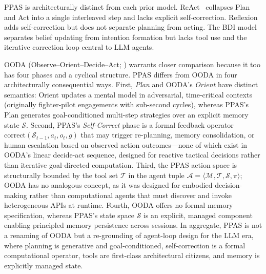 \documentclass[12pt, a4paper]{article}
\begin{document}
PPAS is architecturally distinct from each prior model. ReAct~\citep{yao2023react} collapses Plan and Act into a single interleaved step and lacks explicit self-correction. Reflexion~\citep{shinn2023reflexion} adds self-correction but does not separate planning from acting. The BDI model~\citep{rao1995bdi} separates belief updating from intention formation but lacks tool use and the iterative correction loop central to LLM agents.

OODA (Observe--Orient--Decide--Act; \citealt{boyd1987ooda}) warrants closer comparison because it too has four phases and a cyclical structure. PPAS differs from OODA in four architecturally consequential ways. First, \emph{Plan} and OODA's \emph{Orient} have distinct semantics: Orient updates a mental model in adversarial, time-critical contexts (originally fighter-pilot engagements with sub-second cycles), whereas PPAS's Plan generates goal-conditioned multi-step strategies over an explicit memory state $\mathcal{S}$. Second, PPAS's \emph{Self-Correct} phase is a formal feedback operator $\text{correct}(\mathcal{S}_{t-1}, a_t, o_t, g)$ that may trigger re-planning, memory consolidation, or human escalation based on observed action outcomes---none of which exist in OODA's linear decide-act sequence, designed for reactive tactical decisions rather than iterative goal-directed computation. Third, the PPAS action space is structurally bounded by the tool set $\mathcal{T}$ in the agent tuple $\mathcal{A} = \langle \mathcal{M}, \mathcal{T}, \mathcal{S}, \pi \rangle$; OODA has no analogous concept, as it was designed for embodied decision-making rather than computational agents that must discover and invoke heterogeneous APIs at runtime. Fourth, OODA offers no formal memory specification, whereas PPAS's state space $\mathcal{S}$ is an explicit, managed component enabling principled memory persistence across sessions. In aggregate, PPAS is not a renaming of OODA but a re-grounding of agent-loop design for the LLM era, where planning is generative and goal-conditioned, self-correction is a formal computational operator, tools are first-class architectural citizens, and memory is explicitly managed state.
\end{document}
